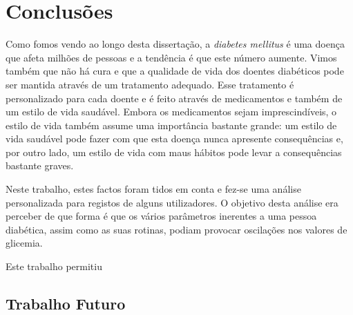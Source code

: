 \chapter{Conclusões}\label{chap:conc}

Como fomos vendo ao longo desta dissertação, a \textit{diabetes mellitus} é uma doença que afeta milhões de pessoas e a tendência é que este número aumente. Vimos também que não há cura e que a qualidade de vida dos doentes diabéticos pode ser mantida através de um tratamento adequado. Esse tratamento é personalizado para cada doente e é feito através de medicamentos e também de um estilo de vida saudável. Embora os medicamentos sejam imprescindíveis, o estilo de vida também assume uma importância bastante grande: um estilo de vida saudável pode fazer com que esta doença nunca apresente consequências e, por outro lado, um estilo de vida com maus hábitos pode levar a consequências bastante graves. 

Neste trabalho, estes factos foram tidos em conta e fez-se uma análise personalizada para registos de alguns utilizadores. O objetivo desta análise era perceber de que forma é que os vários parâmetros inerentes a uma pessoa diabética, assim como as suas rotinas, podiam provocar oscilações nos valores de glicemia. 

Este trabalho permitiu 



\section{Trabalho Futuro}\label{sec:trab}



